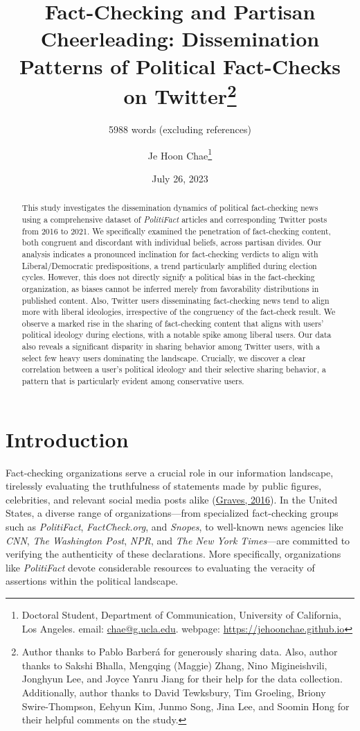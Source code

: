 \documentclass[
  12pt,
]{article}
\title{Fact-Checking and Partisan Cheerleading: Dissemination Patterns
of Political Fact-Checks on Twitter\footnote{Author thanks to Pablo
  Barberá for generously sharing data. Also, author thanks to Sakshi
  Bhalla, Mengqing (Maggie) Zhang, Nino Migineishvili, Jonghyun Lee, and
  Joyce Yanru Jiang for their help for the data collection.
  Additionally, author thanks to David Tewksbury, Tim Groeling, Briony
  Swire-Thompson, Eehyun Kim, Junmo Song, Jina Lee, and Soomin Hong for
  their helpful comments on the study.}}
\subtitle{5988 words (excluding references)}
\author{Je Hoon Chae\footnote{Doctoral Student, Department of
  Communication, University of California, Los Angeles. email:
  \href{mailto:chae@g.ucla.edu}{chae@g.ucla.edu}. webpage:
  \href{https://jehoonchae.github.io}{https://jehoonchae.github.io}}}
\date{July 26, 2023}
\begin{document}
\maketitle
\begin{abstract}
\noindent This study investigates the dissemination dynamics of
political fact-checking news using a comprehensive dataset of
\emph{PolitiFact} articles and corresponding Twitter posts from 2016 to
2021. We specifically examined the penetration of fact-checking content,
both congruent and discordant with individual beliefs, across partisan
divides. Our analysis indicates a pronounced inclination for
fact-checking verdicts to align with Liberal/Democratic predispositions,
a trend particularly amplified during election cycles. However, this
does not directly signify a political bias in the fact-checking
organization, as biases cannot be inferred merely from favorability
distributions in published content. Also, Twitter users disseminating
fact-checking news tend to align more with liberal ideologies,
irrespective of the congruency of the fact-check result. We observe a
marked rise in the sharing of fact-checking content that aligns with
users' political ideology during elections, with a notable spike among
liberal users. Our data also reveals a significant disparity in sharing
behavior among Twitter users, with a select few heavy users dominating
the landscape. Crucially, we discover a clear correlation between a
user's political ideology and their selective sharing behavior, a
pattern that is particularly evident among conservative users.
\end{abstract}
\setlength{\parindent}{20pt}
\setlength{\parskip}{0pt}

\newpage

\doublespacing

\hypertarget{introduction}{%
\section{Introduction}\label{introduction}}

Fact-checking organizations serve a crucial role in our information
landscape, tirelessly evaluating the truthfulness of statements made by
public figures, celebrities, and relevant social media posts alike
(\protect\hyperlink{ref-graves2016}{Graves, 2016}). In the United
States, a diverse range of organizations---from specialized
fact-checking groups such as \emph{PolitiFact}, \emph{FactCheck.org},
and \emph{Snopes}, to well-known news agencies like \emph{CNN},
\emph{The Washington Post}, \emph{NPR}, and \emph{The New York
Times}---are committed to verifying the authenticity of these
declarations. More specifically, organizations like \emph{PolitiFact}
devote considerable resources to evaluating the veracity of assertions
within the political landscape.
\end{document}
